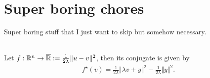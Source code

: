 \documentclass[12pt]{article}
\begin{document}
    \section{Super boring chores}
        Super boring stuff that I just want to skip but somehow necessary. 
        \begin{lemma}\;\label{lemma:chore1}\\
            Let $f:\mathbb R^n \rightarrow \overline {\mathbb R}:= \frac{1}{2\lambda}\Vert u - v\Vert^2$, then its conjugate is given by
            \begin{align*}
                f^\star(v) = \frac{1}{2\lambda}\Vert \lambda v + y\Vert^2 - \frac{1}{2\lambda}\Vert y\Vert^2. 
            \end{align*}
        \end{lemma}
\end{document}
